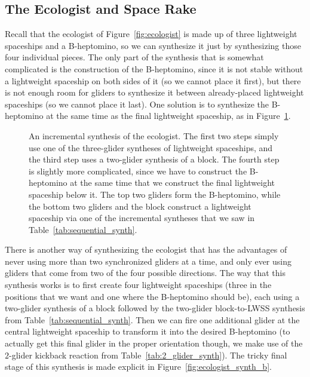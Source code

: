 \subsection{The Ecologist and Space Rake}\label{sec:sequential_space_rake}

Recall that the ecologist of Figure~\ref{fig:ecologist} is made up of three lightweight spaceships and a B-heptomino, so we can synthesize it just by synthesizing those four individual pieces. The only part of the synthesis that is somewhat complicated is the construction of the B-heptomino, since it is not stable without a lightweight spaceship on both sides of it (so we cannot place it first), but there is not enough room for gliders to synthesize it between already-placed lightweight spaceships (so we cannot place it last). One solution is to synthesize the B-heptomino at the same time as the final lightweight spaceship, as in Figure~\ref{fig:ecologist_synth}.

\begin{figure}[!htb]
	\centering
	\caption{An incremental synthesis of the ecologist. The first two steps simply use one of the three-glider syntheses of lightweight spaceships, and the third step uses a two-glider synthesis of a block. The fourth step is slightly more complicated, since we have to construct the B-heptomino at the same time that we construct the final lightweight spaceship below it. The top two gliders form the B-heptomino, while the bottom two gliders and the block construct a lightweight spaceship via one of the incremental syntheses that we saw in Table~\ref{tab:sequential_synth}.}\label{fig:ecologist_synth}
\end{figure}

There is another way of synthesizing the ecologist that has the advantages of never using more than two synchronized gliders at a time, and only ever using gliders that come from two of the four possible directions. The way that this synthesis works is to first create four lightweight spaceships (three in the positions that we want and one where the B-heptomino should be), each using a two-glider synthesis of a block followed by the two-glider block-to-LWSS synthesis from Table~\ref{tab:sequential_synth}. Then we can fire one additional glider at the central lightweight spaceship to transform it into the desired B-heptomino (to actually get this final glider in the proper orientation though, we make use of the $2$-glider kickback reaction from Table~\ref{tab:2_glider_synth}). The tricky final stage of this synthesis is made explicit in Figure~\ref{fig:ecologist_synth_b}.

